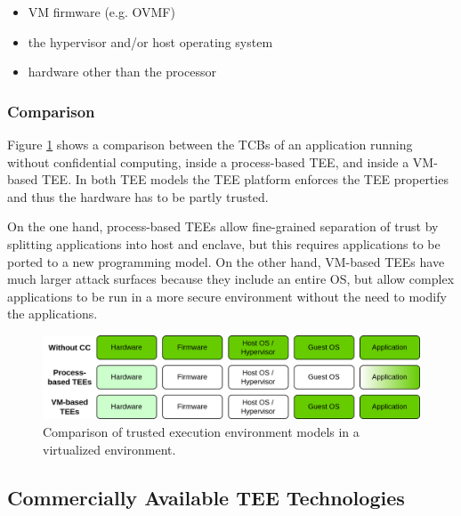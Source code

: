 \begin{itemize}
  \item VM firmware (e.g. OVMF)
  \item the hypervisor and/or host operating system
  \item hardware other than the processor
\end{itemize}

\subsubsection{Comparison}

Figure \ref{figure:cc-tee-comparison} shows a comparison between the TCBs of an
application running without confidential computing, inside a process-based TEE,
and inside a VM-based TEE. In both TEE models the TEE platform enforces the TEE
properties and thus the hardware has to be partly trusted.

On the one hand, process-based TEEs allow fine-grained separation of trust by
splitting applications into host and enclave, but this requires applications to
be ported to a new programming model. On the other hand, VM-based TEEs have much
larger attack surfaces because they include an entire OS, but allow complex
applications to be run in a more secure environment without the need to modify
the applications.

\begin{figure}[H]
  \centering
  \includegraphics[width=0.85\linewidth]{resources/tee-models-comparison.drawio.png}
  \caption{Comparison of trusted execution environment models in a virtualized environment.}
  \label{figure:cc-tee-comparison}
\end{figure}

\subsection{Commercially Available TEE Technologies}
\label{sec:commercial-tee-technologies}

